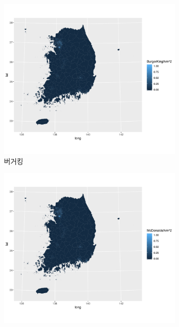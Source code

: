 \documentclass{scrartcl}
\begin{document}
\begin{figure}[!ht]
    \centering
    \begin{subfigure}[b]{0.475\textwidth}
        \centering
        \includegraphics[width=\textwidth]{../figs/B_sig.png}
        \caption{버거킹}\label{fig:fastfood:B}
    \end{subfigure}
    \hfill
    \begin{subfigure}[b]{0.475\textwidth}  
        \centering 
        \includegraphics[width=\textwidth]{../figs/M_sig.png}

\end{subfigure}
\end{figure}
\end{document}
